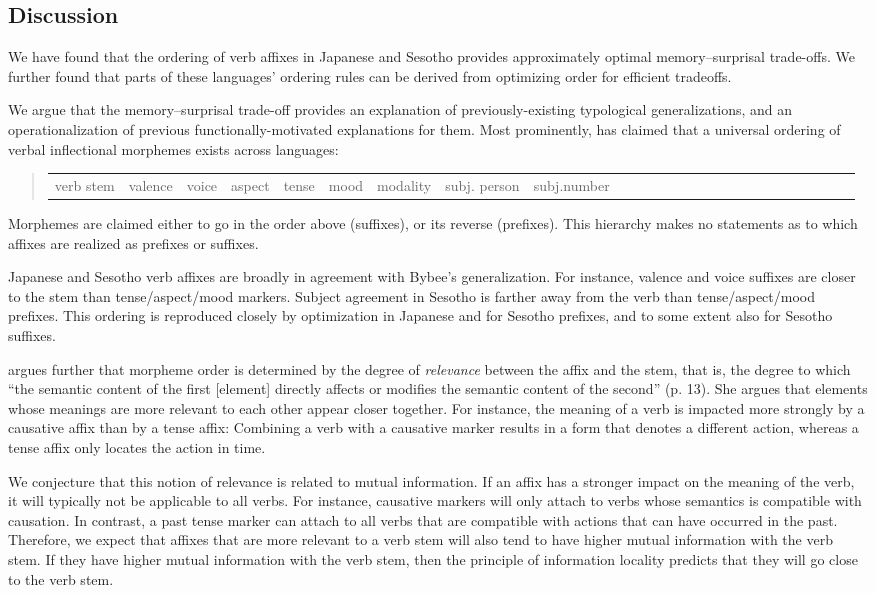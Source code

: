 \subsection{Discussion}
We have found that the ordering of verb affixes in Japanese and Sesotho provides approximately optimal memory--surprisal trade-offs.
We further found that parts of these languages' ordering rules can be derived from optimizing order for efficient tradeoffs.

We argue that the memory--surprisal trade-off provides an explanation of previously-existing typological generalizations, and an operationalization of previous functionally-motivated explanations for them.
Most prominently, \citet{bybee-morphology-1985} has claimed that a universal ordering of verbal inflectional morphemes exists across languages:
\begin{quote}
\begin{tabular}{llllllllllllllllllllllllll}
verb stem & valence & voice & aspect & tense& mood & modality & subj. person & subj.number 
\end{tabular}
\end{quote}
Morphemes are claimed either to go in the order above (suffixes), or its reverse (prefixes). This hierarchy makes no statements as to which affixes are realized as prefixes or suffixes.

Japanese and Sesotho verb affixes are broadly in agreement with Bybee's generalization.
For instance, valence and voice suffixes are closer to the stem than tense/aspect/mood markers.
Subject agreement in Sesotho is farther away from the verb than tense/aspect/mood prefixes.
This ordering is reproduced closely by optimization in Japanese and for Sesotho prefixes, and to some extent also for Sesotho suffixes.

\citet[p. 37]{bybee-morphology-1985} argues further that morpheme order is determined by the degree of \emph{relevance} between the affix and the stem, that is, the degree to which ``the semantic content of the first [element] directly affects or modifies the semantic content of the second'' (p. 13).
She argues that elements whose meanings are more relevant to each other appear closer together.
For instance, the meaning of a verb is impacted more strongly by a causative affix than by a tense affix:
Combining a verb with a causative marker results in a form that denotes a different action, whereas a tense affix only locates the action in time.

We conjecture that this notion of relevance is related to mutual information.
If an affix has a stronger impact on the meaning of the verb, it will typically not be applicable to all verbs.
For instance, causative markers will only attach to verbs whose semantics is compatible with causation.
In contrast, a past tense marker can attach to all verbs that are compatible with actions that can have occurred in the past.
Therefore, we expect that affixes that are more relevant to a verb stem will also tend to have higher mutual information with the verb stem.
If they have higher mutual information with the verb stem, then the principle of information locality predicts that they will go close to the verb stem.
